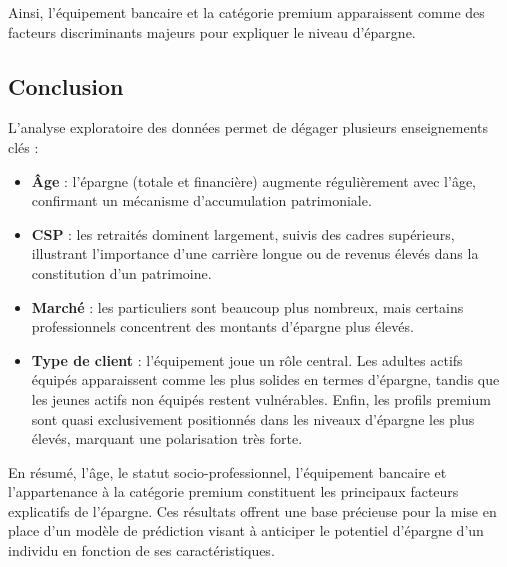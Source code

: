 Ainsi, l'équipement bancaire et la catégorie premium apparaissent comme des facteurs discriminants majeurs pour expliquer le niveau d'épargne.

\subsection{Conclusion}

L'analyse exploratoire des données permet de dégager plusieurs enseignements clés :  

\begin{itemize}
    \item \textbf{Âge} : l'épargne (totale et financière) augmente régulièrement avec l'âge, confirmant un mécanisme d'accumulation patrimoniale.  
    \item \textbf{CSP} : les retraités dominent largement, suivis des cadres supérieurs, illustrant l'importance d'une carrière longue ou de revenus élevés dans la constitution d'un patrimoine.  
    \item \textbf{Marché} : les particuliers sont beaucoup plus nombreux, mais certains professionnels concentrent des montants d'épargne plus élevés.  
    \item \textbf{Type de client} : l'équipement joue un rôle central. Les adultes actifs équipés apparaissent comme les plus solides en termes d'épargne, tandis que les jeunes actifs non équipés restent vulnérables. Enfin, les profils premium sont quasi exclusivement positionnés dans les niveaux d'épargne les plus élevés, marquant une polarisation très forte.  
\end{itemize}

En résumé, l'âge, le statut socio-professionnel, l'équipement bancaire et l'appartenance à la catégorie premium constituent les principaux facteurs explicatifs de l'épargne.  
Ces résultats offrent une base précieuse pour la mise en place d'un modèle de prédiction visant à anticiper le potentiel d'épargne d'un individu en fonction de ses caractéristiques.